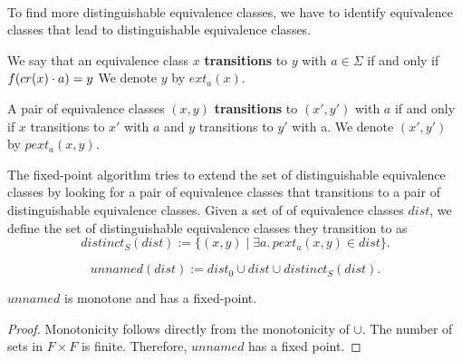\paragraph{}
To find more distinguishable equivalence classes, we have to identify equivalence classes that lead to distinguishable equivalence classes. 
\begin{definition}
    We say that an equivalence class $x$ \textbf{transitions} to $y$ with $a \in \Sigma$ if and only if
        $f (cr(x)\cdot a) = y$
    We denote $y$ by $\mathit{ext_a}(x)$.
\end{definition}
    
\begin{definition}
    A pair of equivalence classes $(x,y)$ \textbf{transitions} to $(x', y')$ with $a$ if and only if $x$ transitions to $x'$ with $a$ and $y$ transitions to $y'$ with a.
    We denote $(x', y')$ by $\mathit{pext_a}(x,y)$.
\end{definition}

The fixed-point algorithm tries to extend the set of distinguishable equivalence classes by looking for a pair of equivalence classes that transitions to a pair of distinguishable equivalence classes. 
Given a set of of equivalence classes $\mathit{dist}$, we define the set of distinguishable equivalence classes they transition to as
\begin{equation*}
    \mathit{distinct_S}(\mathit{dist}) := \{ (x,y) \; | \; \exists a. \, \mathit{pext_a}(x,y) \in \mathit{dist}\}.
\end{equation*}

\begin{definition}
    \label{unnamed}
    \begin{equation*}
        \mathit{unnamed}(\mathit{dist}) := \mathit{dist_0} \cup \mathit{dist} \cup \mathit{distinct_S}(\mathit{dist}).
    \end{equation*}
\end{definition}






\begin{lemma}
    \label{dist_monotone}
    $unnamed$ is monotone and has a fixed-point.
\end{lemma}
\begin{proof}
    Monotonicity follows directly from the monotonicity of $\cup$. 
    The number of sets in $F \times F$ is finite. 
    Therefore, $unnamed$ has a fixed point.

\end{proof}
